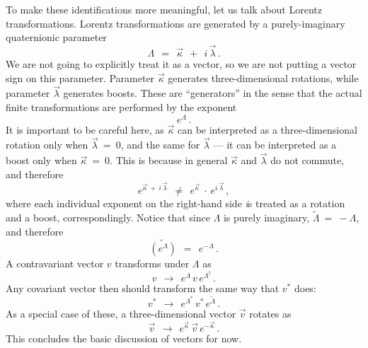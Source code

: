 \documentclass[epsfig,12pt]{article}
\newcommand{\wt}{\widetilde}
\begin{document}
	To make these identifications more meaningful, let us talk about Lorentz transformations.
	Lorentz transformations are generated by a purely-imaginary quaternionic parameter
\begin{equation}
	\Lambda		~~=~~	\vec\kappa  ~~+~~  i\,\vec\lambda\,.
\end{equation}
	We are not going to explicitly treat it as a vector, so we are not putting a vector sign on this parameter.
	Parameter $ \vec\kappa $ generates three-dimensional rotations, while parameter $ \vec\lambda $
	generates boosts.
	These are ``generators'' in the sense that the actual finite transformations are performed by the exponent
\begin{equation}
	e^\Lambda\,.
\end{equation}
	It is important to be careful here, as $ \vec\kappa $ can be interpreted as a three-dimensional rotation
	only when $ \vec\lambda ~=~ 0 $, and the same for $ \vec\lambda $ --- it can be interpreted as a boost
	only when $ \vec\kappa ~=~ 0 $.
	This is because in general $ \vec\kappa $ and $ \vec\lambda $ do not commute, and therefore
\begin{equation}
	e^{\vec\kappa ~+~ i\,\vec\lambda}	~~\neq~~	e^{\vec\kappa}  ~\cdot~  e^{i\,\vec\lambda}\,,
\end{equation}
	where each individual exponent on the right-hand side {\emph is} treated as a rotation and a boost,
	correspondingly.
	Notice that since $ \Lambda $ is purely imaginary, $ \wt\Lambda ~=~ -\Lambda $, and therefore
\begin{equation}
	\wt{(e^\Lambda)}		~~=~~	e^{-\Lambda}\,.
\end{equation}
	A contravariant vector $ v $ transforms under $ \Lambda $ as
\begin{equation}
\label{contra}
	v	~~\to~~		e^\Lambda\,v\,e^{\Lambda^\dag}\,.
\end{equation}
	Any covariant vector then should transform the same way that $ v^* $ does:
\begin{equation}
\label{co}
	v^*	~~\to~~		e^{\Lambda^*}\,v^*\,e^{\wt\Lambda}\,.
\end{equation}
	As a special case of these, a three-dimensional vector $ \vec v $ rotates as
\begin{equation}
\label{rotation}
	\vec v	~~\to~~		e^{\vec\kappa}\,\vec v\,e^{-\vec\kappa}\,.
\end{equation}
	This concludes the basic discussion of vectors for now.
\end{document}
